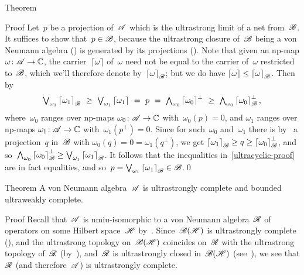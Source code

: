 \documentclass[a]{subfiles}
\begin{document}
\begin{parsec}
\begin{point}[vnsac]{Theorem}
\begin{point}{Proof}
Let~$p$ be a projection of~$\mathscr{A}$ which is the ultrastrong limit
of a net from~$\mathscr{B}$. It suffices to show that~$p\in\mathscr{B}$,
because the ultrastrong closure of~$\mathscr{B}$
being a von Neumann algebra ()
is generated by its projections ().
Note that given an np-map $\omega\colon \mathscr{A}\to\mathbb{C}$,
the carrier~$\left\lceil\omega\right\rceil$ of~$\omega$
need not be equal to the carrier
of~$\omega$ restricted to~$\mathscr{B}$,
which we'll therefore denote by~$\left\lceil\omega\right\rceil_{\mathscr{B}}$;
but we do have $\left\lceil\omega\right\rceil\leq \left\lceil\omega\right\rceil_{\mathscr{B}}$.
Then by~
\begin{equation}
\label{ultracyclic-proof}
\textstyle
\bigvee_{\omega_1}
\ceil{\omega_1}_\scrB \ \geq\ 
\bigvee_{\omega_1}
\ceil{\omega_1}\ =\ p\ =\ 
\bigwedge_{\omega_0} \ceil{\omega_0}^\perp
\ \geq\ \bigwedge_{\omega_0} \ceil{\omega_0}_{\scrB}^\perp,
\end{equation}
where~$\omega_0$ ranges over np-maps $\omega_0\colon \mathscr{A}\to\mathbb{C}$
with~$\omega_0(p)=0$,
 and $\omega_1$ ranges over
np-maps $\omega_1\colon \mathscr{A}\to\mathbb{C}$ with~$\omega_1(p^\perp)=0$.
Since for such~$\omega_0$ and~$\omega_1$
there is 
by~
a projection~$q$ in~$\mathscr{B}$
with $\omega_0(q)=0=\omega_1(q^\perp)$,
we get 
$\left\lceil\omega_1\right\rceil_{\mathscr{B}} \geq q \geq 
\left\lceil\omega_0\right\rceil_{\mathscr{B}}^\perp$,
and so~$\bigwedge_{\omega_0} \left\lceil\omega_0\right\rceil_{\mathscr{B}}^\perp 
\geq \bigvee_{\omega_1} \left\lceil\omega_1\right\rceil_{\mathscr{B}}$.
It follows that the inequalities in~\eqref{ultracyclic-proof}
are in fact equalities,
and so~$p=\bigvee_{\omega_1}\left\lceil\omega_1\right\rceil_{\mathscr{B}} \in \mathscr{B}$.\qed
\end{point}
\end{point}
\begin{point}[vn-complete]{Theorem}%
A von Neumann algebra~$\mathscr{A}$ is ultrastrongly complete
and bounded ultraweakly complete.
\begin{point}{Proof}%
Recall that~$\mathscr{A}$
is nmiu-isomorphic
to a von Neumann algebra~$\mathscr{R}$ of operators on some Hilbert space~$\mathscr{H}$
by~\sref{ngns}.
Since~$\mathscr{B}(\mathscr{H})$ is ultrastrongly complete
(),
and the ultrastrong topology on~$\mathscr{B}(\mathscr{H})$
coincides on~$\mathscr{R}$ with the ultrastrong topology of~$\mathscr{R}$
(by~\sref{us-permanence}),
and~$\mathscr{R}$ is 
 ultrastrongly closed in~$\mathscr{B}(\mathscr{H})$
(see~),
we see that $\mathscr{R}$ (and therefore~$\mathscr{A}$) is 
ultrastrongly complete.


\end{point}
\end{point}
\end{parsec}
\end{document}
